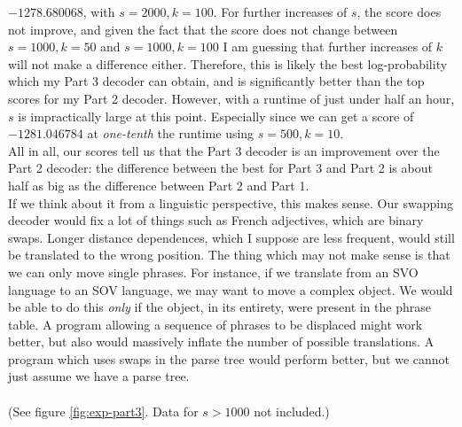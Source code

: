 \documentclass[answers]{exam}
\begin{document}
\begin{questions}
\addtocounter{question}{1}
\begin{framed}
  $-1278.680068$, with $s = 2000, k = 100$. For further increases of $s$,
  the score does not improve, and given the fact that the score does not change
  between $s = 1000, k = 50$ and $s = 1000, k = 100$ I am guessing that further
  increases of $k$ will not make a difference either.
  Therefore, this is likely the best log-probability which my Part 3 decoder can
  obtain, and is significantly better than the top scores for my Part 2 decoder.
  However, with a runtime of just under half an hour, $s$ is impractically large
  at this point. Especially since we can get a score of $-1281.046784$ at
  \emph{one-tenth} the runtime using $s = 500, k = 10$. 
  \\
  All in all, our scores tell us that the Part 3 decoder is an improvement over
  the Part 2 decoder: the difference between the best for Part 3 and Part 2 is
  about half as big as the difference between Part 2 and Part 1.
  \\
  If we think about it from a linguistic perspective, this makes sense. Our
  swapping decoder would fix a lot of things such as French adjectives, which
  are binary swaps. Longer distance dependences, which I suppose are less
  frequent, would still be translated to the wrong position. The thing which may
  not make sense is that we can only move single phrases. For instance, if we
  translate from an SVO language to an SOV language, we may want to move a
  complex object. We would be able to do this \emph{only} if the object, in its
  entirety, were present in the phrase table. A program allowing a sequence of
  phrases to be displaced might work better, but also would massively inflate
  the number of possible translations. A program which uses swaps in the parse
  tree would perform better, but we cannot just assume we have a parse tree.
  \\
  \\
  (See figure \ref{fig:exp-part3}. Data for $s > 1000$ not included.)
\end{framed}
\end{questions}


\end{document}
